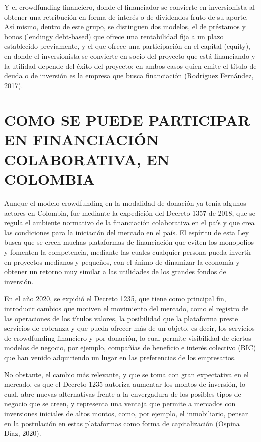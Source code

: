 \documentclass[
]{book}
\begin{document}
Y el crowdfunding financiero, donde el financiador se convierte en inversionista al obtener una retribución en forma de interés o de dividendos fruto de su aporte. Así mismo, dentro de este grupo, se distinguen dos modelos, el de préstamos y bonos (lendingy debt-based) que ofrece una rentabilidad fija a un plazo establecido previamente, y el que ofrece una participación en el capital (equity), en donde el inversionista se convierte en socio del proyecto que está financiando y la utilidad depende del éxito del proyecto; en ambos casos quien emite el título de deuda o de inversión es la empresa que busca financiación (Rodríguez Fernández, 2017).

\hypertarget{como-se-puede-participar-en-financiaciuxf3n-colaborativa-en-colombia}{%
\chapter{COMO SE PUEDE PARTICIPAR EN FINANCIACIÓN COLABORATIVA, EN COLOMBIA}\label{como-se-puede-participar-en-financiaciuxf3n-colaborativa-en-colombia}}

Aunque el modelo crowdfunding en la modalidad de donación ya tenía algunos actores en Colombia, fue mediante la expedición del Decreto 1357 de 2018, que se regula el ambiente normativo de la financiación colaborativa en el país y que crea las condiciones para la iniciación del mercado en el país. El espíritu de esta Ley busca que se creen muchas plataformas de financiación que eviten los monopolios y fomenten la competencia, mediante las cuales cualquier persona pueda invertir en proyectos medianos y pequeños, con el ánimo de dinamizar la economía y obtener un retorno muy similar a las utilidades de los grandes fondos de inversión.

En el año 2020, se expidió el Decreto 1235, que tiene como principal fin, introducir cambios que motiven el movimiento del mercado, como el registro de las operaciones de los títulos valores, la posibilidad que la plataforma preste servicios de cobranza y que pueda ofrecer más de un objeto, es decir, los servicios de crowdfunding financiero y por donación, lo cual permite visibilidad de ciertos modelos de negocio, por ejemplo, compañías de beneficio e interés colectivo (BIC) que han venido adquiriendo un lugar en las preferencias de los empresarios.

No obstante, el cambio más relevante, y que se toma con gran expectativa en el mercado, es que el Decreto 1235 autoriza aumentar los montos de inversión, lo cual, abre nuevas alternativas frente a la envergadura de los posibles tipos de negocio que se creen, y representa una ventaja que permite a mercados con inversiones iniciales de altos montos, como, por ejemplo, el inmobiliario, pensar en la postulación en estas plataformas como forma de capitalización (Ospina Díaz, 2020).
\end{document}
